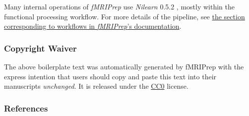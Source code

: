 \documentclass[]{article}
\begin{document}
Many internal operations of \emph{fMRIPrep} use \emph{Nilearn} 0.5.2
\citep[RRID:SCR\_001362]{nilearn}, mostly within the functional
processing workflow. For more details of the pipeline, see
\href{https://fmriprep.readthedocs.io/en/latest/workflows.html}{the
section corresponding to workflows in \emph{fMRIPrep}'s documentation}.

\hypertarget{copyright-waiver}{%
\subsubsection{Copyright Waiver}\label{copyright-waiver}}

The above boilerplate text was automatically generated by fMRIPrep with
the express intention that users should copy and paste this text into
their manuscripts \emph{unchanged}. It is released under the
\href{https://creativecommons.org/publicdomain/zero/1.0/}{CC0} license.

\hypertarget{references}{%
\subsubsection{References}\label{references}}


\end{document}
